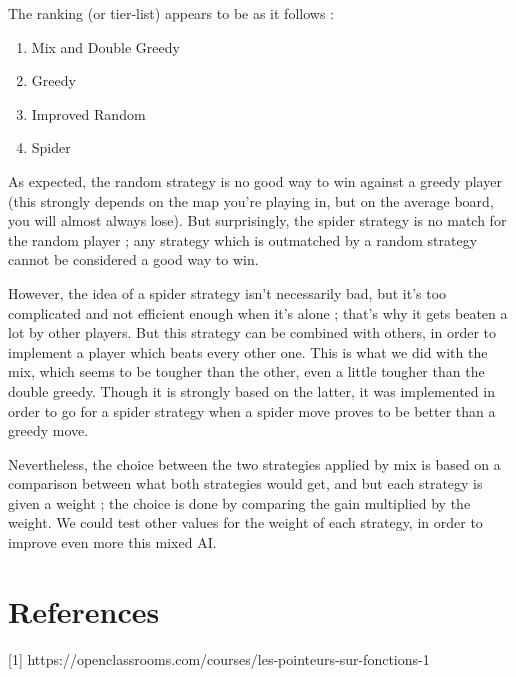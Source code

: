 \documentclass[a4paper]{article}
\begin{document}
The ranking (or tier-list) appears to be as it follows :
\begin{enumerate}
\item Mix and Double Greedy
\item Greedy
\item Improved Random
\item Spider
\end{enumerate}


As expected, the random strategy is no good way to win against a greedy player (this strongly depends on the map you're playing in, but on the average board, you will almost always lose). But surprisingly, the spider strategy is no match for the random player ; any strategy which is outmatched by a random strategy cannot be considered a good way to win.

However, the idea of a spider strategy isn't necessarily bad, but it's too complicated and not efficient enough when it's alone ; that's why it gets beaten a lot by other players. But this strategy can be combined with others, in order to implement a player which beats every other one. This is what we did with the mix, which seems to be tougher than the other, even a little tougher than the double greedy. Though it is strongly based on the latter, it was implemented in order to go for a spider strategy when a spider move proves to be better than a greedy move.

Nevertheless, the choice between the two strategies applied by mix is based on a comparison between what both strategies would get, and but each strategy is given a weight ; the choice is done by comparing the gain multiplied by the weight. We could test other values for the weight of each strategy, in order to improve even more this mixed AI.

\section{References}
	[1] https://openclassrooms.com/courses/les-pointeurs-sur-fonctions-1
\end{document}
